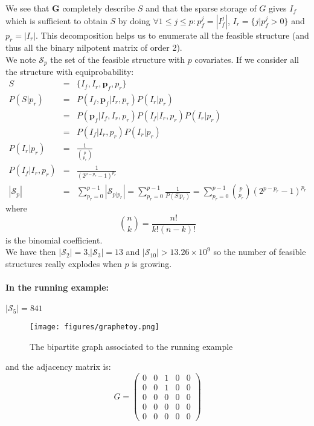 \documentclass[12pt,a4paper]{report}
\begin{document}
	We see that $\boldsymbol{G}$ completely describe $S$ and that the sparse storage of $G$ gives $I_f$ which is sufficient to obtain $S$ by doing $\forall 1\leq j\leq p :  p_f^j=|I_f^j|$, $I_r=\{j |p_f^j>0 \}$ and $p_r=|I_r|$.
	This decomposition helps us to enumerate all the feasible structure (and thus all the binary nilpotent matrix of order 2).\\
	We note $\mathcal{S}_p$ the set of the feasible structure with $p$ covariates. If we consider all the structure with equiprobability:
	\begin{eqnarray}
		S&=&\{I_f,I_r,\boldsymbol{p}_f,p_r\} \\
		P(S|p_r)&=&P(I_f , \boldsymbol{p}_f|I_r,p_r)P(I_r|p_r) \\
		&=&P(\boldsymbol{p}_f|I_f, I_r,p_r)P(I_f |I_r,p_r)P(I_r|p_r) \\
		&=&P(I_f |I_r,p_r)P(I_r|p_r) \\
		P(I_r|p_r)&=& \frac{1}{{p \choose p_r}} \\
		P(I_f|I_r,p_r)&=& \frac{1}{(2^{p-p_r}-1)^{p_r}}\\
		|\mathcal{S}_p|&=&\sum_{p_r=0}^{p-1}|\mathcal{S}_{p|p_r}|= \sum_{p_r=0}^{p-1}\frac{1}{P(S|p_r)} =\sum_{p_r=0}^{p-1}{p \choose p_r}(2^{p-p_r}-1)^{p_r}
	\end{eqnarray}
	where \begin{equation}
	{n \choose k}=\frac{n!}{k!(n-k)!}
	\end{equation} is the binomial coefficient.\\
	We have then $|\mathcal{S}_2| =3 $,$|\mathcal{S}_3| =13 $ and $|\mathcal{S}_{10}| >13.26\times10^9 $ so the number of feasible structures really explodes when $p$ is growing.

\paragraph{In the running example:} $|\mathcal{S}_5| =841 $

\begin{figure}[h!]
	\centering
	\texttt{[image: figures/graphetoy.png]} 
	\caption{The bipartite graph associated to the running example}
	\end{figure}	
and the adjacency matrix is:
\begin{displaymath}G=\left(	\begin{array}{ccccc}
	0 & 0 & 1 & 0 & 0 \\ 
	0 & 0 & 1 & 0 & 0 \\ 
	0 & 0 & 0 & 0 & 0 \\ 
	0 & 0 & 0 & 0 & 0 \\ 
	0 & 0 & 0 & 0 & 0
	\end{array} \right)
\end{displaymath}
\end{document}
